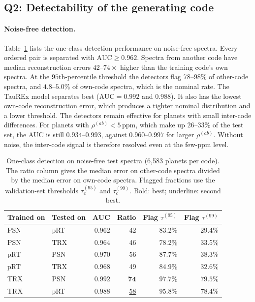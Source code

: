 \subsection{Q2: Detectability of the generating code}
\label{sec:res_q2}

\paragraph{Noise-free detection.}
Table~\ref{tab:auc0} lists the one-class detection performance on noise-free spectra.
Every ordered pair is separated with $\mathrm{AUC}\geq0.962$.
Spectra from another code have median reconstruction errors $42$--$74\times$ higher than the training code's own spectra.
At the $95$th-percentile threshold the detectors flag 78--98\% of other-code spectra, and $4.8$--$5.0\%$ of own-code spectra, which is the nominal rate.
The TauREx model separates best ($\mathrm{AUC}=0.992$ and $0.988$).
It also has the lowest own-code reconstruction error, which produces a tighter nominal distribution and a lower threshold.
The detectors remain effective for planets with small inter-code differences.
For planets with $\rho^{(ab)}<5\,\mathrm{ppm}$, which make up 26--33\% of the test set, the AUC is still $0.934$--$0.993$, against $0.960$--$0.997$ for larger $\rho^{(ab)}$.
Without noise, the inter-code signal is therefore resolved even at the few-ppm level.

\begin{table}[t]
  \centering
  \caption{One-class detection on noise-free test spectra (6{,}583 planets per code). The ratio column gives the median error on other-code spectra divided by the median error on own-code spectra. Flagged fractions use the validation-set thresholds $\tau^{(95)}_c$ and $\tau^{(99)}_c$. Bold: best; underline: second best.}
  \label{tab:auc0}
  \begin{tabular}{llrrrr}
    \toprule
    Trained on & Tested on & AUC & Ratio & Flag $\tau^{(95)}$ & Flag $\tau^{(99)}$ \\
    \midrule
    PSN & pRT & $0.962$ & 42 & 83.2\% & 29.4\% \\
    PSN & TRX & $0.964$ & 46 & 78.2\% & 33.5\% \\
    pRT & PSN & $0.970$ & 56 & 87.7\% & 38.3\% \\
    pRT & TRX & $0.968$ & 49 & 84.9\% & 32.6\% \\
    TRX & PSN & $\mathbf{0.992}$ & $\mathbf{74}$ & $\mathbf{97.7\%}$ & $\mathbf{79.5\%}$ \\
    TRX & pRT & \underline{$0.988$} & \underline{58} & \underline{$95.8\%$} & \underline{$78.4\%$} \\
    \bottomrule
  \end{tabular}
\end{table}

